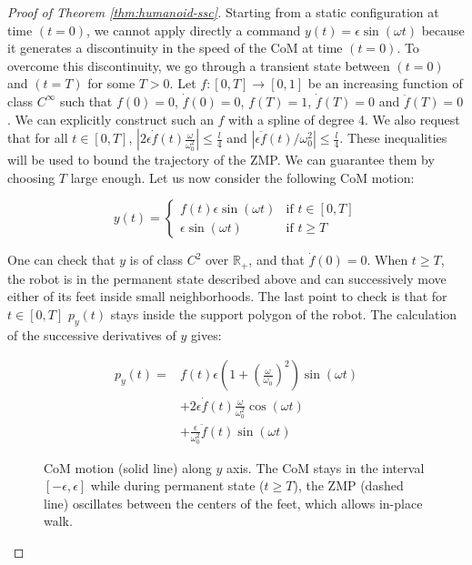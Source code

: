 \documentclass{article}
\begin{document}
\begin{proof}[Proof of Theorem \ref{thm:humanoid-ssc}]
Starting from a static configuration at time $(t=0)$, we cannot apply
directly  a  command  $y(t)  =  \epsilon \sin(\omega  t)$  because  it
generates  a discontinuity  in the  speed of  the CoM  at time $(t=0)$. To
overcome this  discontinuity, we go through a  transient state between
$(t=0)$ and  $(t=T)$ for some  $T >0$. Let  $f:[0,T] \rightarrow
[0,1]$  be an  increasing function of class $C^\infty$  such  that  $f(0)  =  0$,
$\dot{f}(0) = 0$, $f(T) =  1$, $\dot{f}(T) = 0$ and $\ddot{f}(T)
=  0$.  We can explicitly  construct  such  an $f$   with  a
spline of degree  4.   We   also   request   that   for  all   $t   \in   [0,T]$,
$|2\epsilon\dot{f}(t)\frac{\omega}{\omega_0^2}|   \leq  \frac{l}{4}$
and   $|\epsilon\ddot{f}(t)/\omega_0^2|  \leq   \frac{l}{4}$.  These
inequalities  will be  used  to bound  the  trajectory of  the  ZMP. We  can
guarantee them by  choosing $T$ large enough. Let  us now consider the
following CoM motion:

\[
y(t) = \left\{
\begin{array}{ll}
f(t)\epsilon\sin(\omega t) 
& \text{if } t\in [0,T]
\\ 
\epsilon\sin(\omega t) 
& \text{if } t \geq T \end{array}
\right.
\]

One can  check that $y$  is of class $C^2$ over  $\mathbb{R}_+$, and
that $\dot{f}(0) = 0$. When $t\geq T$, the robot is in the permanent
state described above  and can successively move either of its 
feet  inside small neighborhoods.
The  last point to check
is that for $t \in  [0,T]$ $p_y(t)$ stays inside the support polygon
of the robot. The calculation of the successive derivatives of $y$ gives:

\[
\begin{array}{cl}
p_y(t) = &  f(t) \epsilon (1 + \left(\frac{\omega}{\omega_0}\right)^2)
\sin (\omega  t) \\ &  + 2\epsilon \dot{f}(t)\frac{\omega}{\omega_0^2}
\cos  (\omega t)  \\ &  +  \frac{\epsilon}{\omega_0^2}\ddot{f}(t) \sin
(\omega t)
\end{array}
\]



\begin{figure}
\centering


\caption{CoM motion (solid line) along $y$ axis.  The CoM stays in the interval
  $[-\epsilon,\epsilon]$ while during  permanent state ($t \geq T$),
  the ZMP (dashed line) oscillates between the centers of the feet, which allows
  in-place walk.}
\label{fig:zmp-inplace}
\end{figure}


\end{proof}
\end{document}
